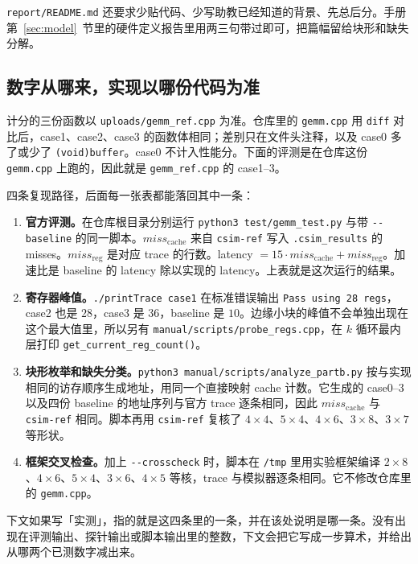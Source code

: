 \documentclass[11pt,a4paper,fontset=fandol]{ctexart}
\newcommand{\code}[1]{\texttt{#1}}
\newcommand{\mreg}{\mathit{miss}_{\mathrm{reg}}}
\newcommand{\mc}{\mathit{miss}_{\mathrm{cache}}}
\begin{document}
\code{report/README.md} 还要求少贴代码、少写助教已经知道的背景、先总后分。手册第~\ref{sec:model}~节里的硬件定义报告里用两三句带过即可，把篇幅留给块形和缺失分解。

\subsection{数字从哪来，实现以哪份代码为准}

计分的三份函数以 \code{uploads/gemm\_ref.cpp} 为准。仓库里的 \code{gemm.cpp} 用 \code{diff} 对比后，case1、case2、case3 的函数体相同；差别只在文件头注释，以及 case0 多了或少了 \code{(void)buffer}。case0 不计入性能分。下面的评测是在仓库这份 \code{gemm.cpp} 上跑的，因此就是 \code{gemm\_ref.cpp} 的 case1--3。

四条复现路径，后面每一张表都能落回其中一条：

\begin{enumerate}
  \item \textbf{官方评测。}在仓库根目录分别运行 \code{python3 test/gemm\_test.py} 与带 \code{-{}-baseline} 的同一脚本。$\mc$ 来自 \code{csim-ref} 写入 \code{.csim\_results} 的 misses。$\mreg$ 是对应 trace 的行数。latency $=15\cdot\mc+\mreg$。加速比是 baseline 的 latency 除以实现的 latency。上表就是这次运行的结果。
  \item \textbf{寄存器峰值。}\code{./printTrace case1} 在标准错误输出 \code{Pass using 28 regs}，case2 也是 $28$，case3 是 $36$，baseline 是 $10$。边缘小块的峰值不会单独出现在这个最大值里，所以另有 \code{manual/scripts/probe\_regs.cpp}，在 $k$ 循环最内层打印 \code{get\_current\_reg\_count()}。
  \item \textbf{块形枚举和缺失分类。}\code{python3 manual/scripts/analyze\_partb.py} 按与实现相同的访存顺序生成地址，用同一个直接映射 cache 计数。它生成的 case0--3 以及四份 baseline 的地址序列与官方 trace 逐条相同，因此 $\mc$ 与 \code{csim-ref} 相同。脚本再用 \code{csim-ref} 复核了 $4\times4$、$5\times4$、$4\times6$、$3\times8$、$3\times7$ 等形状。
  \item \textbf{框架交叉检查。}加上 \code{-{}-crosscheck} 时，脚本在 \code{/tmp} 里用实验框架编译 $2\times8$、$4\times6$、$5\times4$、$3\times6$、$4\times5$ 等核，trace 与模拟器逐条相同。它不修改仓库里的 \code{gemm.cpp}。
\end{enumerate}

下文如果写「实测」，指的就是这四条里的一条，并在该处说明是哪一条。没有出现在评测输出、探针输出或脚本输出里的整数，下文会把它写成一步算术，并给出从哪两个已测数字减出来。

\end{document}
